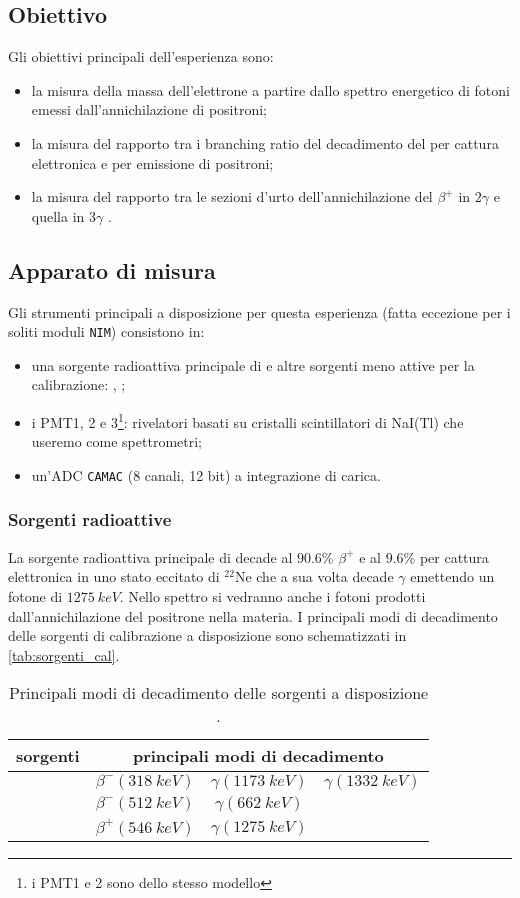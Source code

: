 \subsection{Obiettivo}
Gli obiettivi principali dell'esperienza sono:
\begin{itemize}
	\item la misura della massa dell'elettrone a partire dallo spettro energetico di fotoni emessi dall'annichilazione di positroni;
	\item la misura del rapporto tra i branching ratio del decadimento del  \na\; per cattura elettronica e per emissione di positroni;
	\item la misura del rapporto tra le sezioni d'urto dell'annichilazione del $\beta^+$ in $2\gamma$ e quella in $3\gamma$ .
\end{itemize}

\subsection{Apparato di misura}
Gli strumenti principali a disposizione per questa esperienza (fatta eccezione per i soliti moduli \texttt{NIM}) consistono in:
\begin{itemize}
	\item una sorgente radioattiva principale di \na\; e altre sorgenti meno attive per la calibrazione: \cs\;, \co\;;
	\item i PMT1, 2 e 3\footnote{i PMT1 e 2 sono dello stesso modello}: rivelatori basati su cristalli scintillatori di NaI(Tl) che useremo come spettrometri;
	\item un'ADC \texttt{CAMAC} (8 canali, 12 bit) a integrazione di carica.
\end{itemize}

\subsubsection{Sorgenti radioattive}
La sorgente radioattiva principale di \na\; decade al $90.6\%$ $\beta^+$ e al $9.6\%$ per cattura elettronica in uno stato eccitato di $^{22}$Ne che a sua volta decade $\gamma$ emettendo un fotone di $\SI{1275}{keV}$. Nello spettro si vedranno anche i fotoni prodotti dall'annichilazione del positrone nella materia.
I principali modi di decadimento delle sorgenti di calibrazione a disposizione sono schematizzati in \autoref{tab:sorgenti_cal}.

\begin{table}[h]
	\centering
	\begin{tabular}{cccc}
		\toprule
		sorgenti & \multicolumn{3}{c}{principali modi di decadimento} \\
		\midrule
		\co & $\beta^{-} (\SI{318}{keV})$ & $\gamma (\SI{1173}{keV})$ & $\gamma (\SI{1332}{keV})$  \\
		\cs & $\beta^{-} (\SI{512}{keV})$ & $\gamma (\SI{662}{keV})$ \\
		\na & $\beta^{+} (\SI{546}{keV})$ & $\gamma (\SI{1275}{keV})$ \\
		\bottomrule
	\end{tabular}
	\caption{\label{tab:sorgenti_cal} Principali modi di decadimento delle sorgenti a disposizione \cite{2}.}
\end{table}

